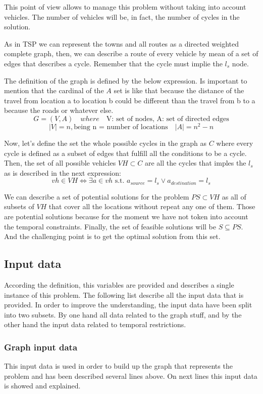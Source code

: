 \documentclass[]{report}
\begin{document}
This point of view allows to manage this problem without taking into account vehicles. The number of vehicles will be, in fact, the number of cycles in the solution.

As in TSP we can represent the towns and all routes as a directed weighted complete graph, then, we can describe a route of every vehicle by mean of a set of edges that describes a cycle. Remember that the cycle must implie the $l_{s}$ node.

The definition of the graph is defined by the below expression. Is important to mention that the cardinal of the $A$ set is like that because the distance of the travel from location a to location b could be different than the travel from b to a because the roads or whatever else.
$$G=(V,A) \quad where \quad \text{V: set of nodes, A: set of directed edges}$$
$$|V|=n, \text{being n = number of locations} \quad |A|=n^{2}-n$$

Now, let's define the set the whole possible cycles in the graph as $C$ where every cycle is defined as a subset of edges that fulfill all the conditions to be a cycle. Then, the set of all possible vehicles $VH \subset C$ are all the cycles that imples the $l_{s}$ as is described in the next expression:
$$vh \in VH \Leftrightarrow \exists a \in vh \text{ s.t. } a_{source} = l_{s} \lor a_{destination} = l_{s}$$

We can describe a set of potential solutions for the problem $PS \subset VH$ as all of subsets of $VH$ that cover all the locations without repeat any one of them. Those are potential solutions because for the moment we have not token into account the temporal constraints. Finally, the set of feasible solutions will be $S \subseteq PS$. And the challenging point is to get the optimal solution from this set.

\subsection{Input data}

According the definition, this variables are provided and describes a single instance of this problem. The following list describe all the input data that is provided. In order to improve the understanding, the input data have been split into two subsets. By one hand all data related to the graph stuff, and by the other hand the input data related to temporal restrictions.

\subsubsection{Graph input data}\label{sss:graph_constraints}
This input data is used in order to build up the graph that represents the problem and has been described several lines above. On next lines this input data is showed and explained.
\end{document}
